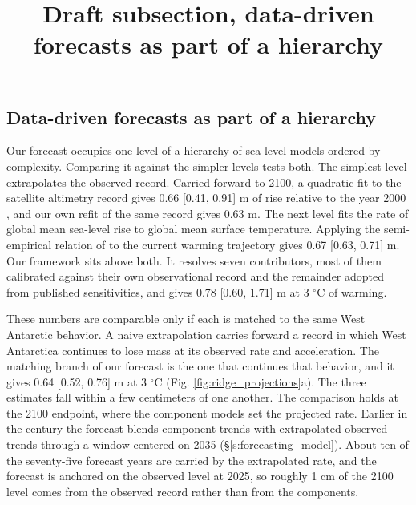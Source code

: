 \documentclass[12pt]{article}
\title{Draft subsection, data-driven forecasts as part of a hierarchy}
\author{}
\date{}
\begin{document}
\maketitle


\subsection{Data-driven forecasts as part of a hierarchy}

Our forecast occupies one level of a hierarchy of sea-level models ordered by complexity. Comparing it against the simpler levels tests both. The simplest level extrapolates the observed record. Carried forward to 2100, a quadratic fit to the satellite altimetry record gives 0.66 [0.41, 0.91] m of rise relative to the year 2000 \citep{Hamlington2024, Nerem2022}, and our own refit of the same record gives 0.63 m. The next level fits the rate of global mean sea-level rise to global mean surface temperature. Applying the semi-empirical relation of \citet{Rahmstorf2007} to the current warming trajectory gives 0.67 [0.63, 0.71] m. Our framework sits above both. It resolves seven contributors, most of them calibrated against their own observational record and the remainder adopted from published sensitivities, and gives 0.78 [0.60, 1.71] m at 3 $^\circ$C of warming.

These numbers are comparable only if each is matched to the same West Antarctic behavior. A naive extrapolation carries forward a record in which West Antarctica continues to lose mass at its observed rate and acceleration. The matching branch of our forecast is the one that continues that behavior, and it gives 0.64 [0.52, 0.76] m at 3 $^\circ$C (Fig. \ref{fig:ridge_projections}a). The three estimates fall within a few centimeters of one another. The comparison holds at the 2100 endpoint, where the component models set the projected rate. Earlier in the century the forecast blends component trends with extrapolated observed trends through a window centered on 2035 (\S\ref{s:forecasting_model}). About ten of the seventy-five forecast years are carried by the extrapolated rate, and the forecast is anchored on the observed level at 2025, so roughly 1 cm of the 2100 level comes from the observed record rather than from the components.
\end{document}
